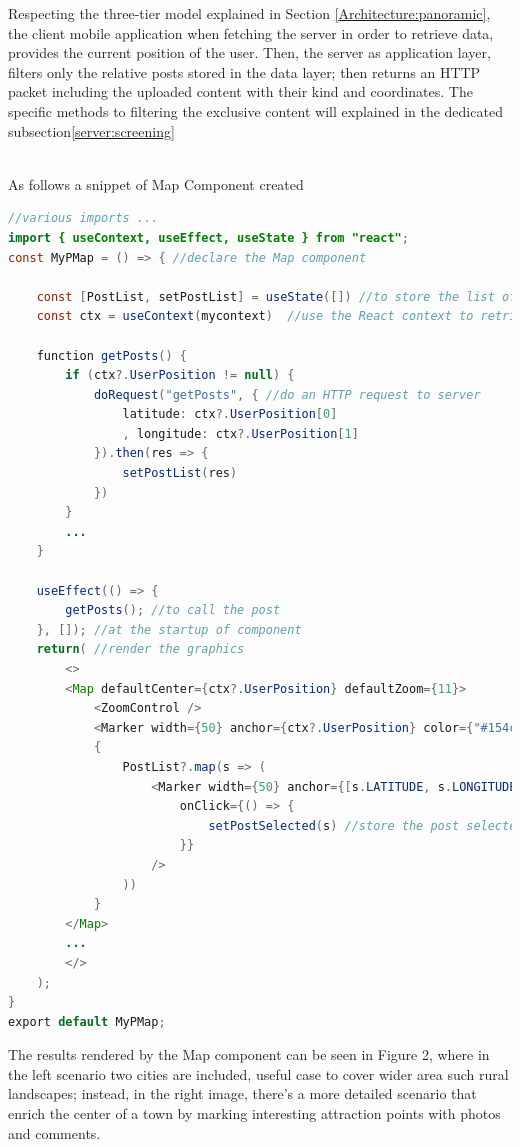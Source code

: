 \documentclass[conference]{IEEEtran}
\begin{document}
Respecting the three-tier model explained in Section \ref{Architecture:panoramic}, the client mobile application when fetching the server in order to retrieve data, provides the current position of the user. Then, the server as application layer, filters only the relative posts stored in the data layer; then returns an HTTP packet including the uploaded content with their kind and coordinates.
The specific methods to filtering the exclusive content will explained in the dedicated subsection\ref{server:screening}


\\
As follows a snippet of Map Component created
\begin{lstlisting}[language=Java, caption=Map component snippet]
//various imports ...
import { useContext, useEffect, useState } from "react";
const MyPMap = () => { //declare the Map component

    const [PostList, setPostList] = useState([]) //to store the list of posts
    const ctx = useContext(mycontext)  //use the React context to retrieve data of other components
    
    function getPosts() {
        if (ctx?.UserPosition != null) {
            doRequest("getPosts", { //do an HTTP request to server
                latitude: ctx?.UserPosition[0]
                , longitude: ctx?.UserPosition[1]
            }).then(res => {
                setPostList(res)
            })
        } 
        ...
    }
    
    useEffect(() => {
        getPosts(); //to call the post
    }, []); //at the startup of component
    return( //render the graphics
        <>
        <Map defaultCenter={ctx?.UserPosition} defaultZoom={11}>
            <ZoomControl />
            <Marker width={50} anchor={ctx?.UserPosition} color={"#154c79"} />
            {
                PostList?.map(s => (
                    <Marker width={50} anchor={[s.LATITUDE, s.LONGITUDE]} color={(s?.MEDIATYPE?.length > 0) ? '#d6c531' : '#f23c3c'}
                        onClick={() => {
                            setPostSelected(s) //store the post selected to open it in the opportuned component (viewPost)
                        }}
                    />
                ))
            }
        </Map>
        ...
        </>
    );
}
export default MyPMap;
\end{lstlisting}

The results rendered by the Map component can be seen in Figure 2, where in the left scenario two cities are included, useful case to cover wider area such rural landscapes; instead, in the right image, there's a more detailed scenario that enrich the center of a town by marking interesting attraction points with photos and comments.
\end{document}
